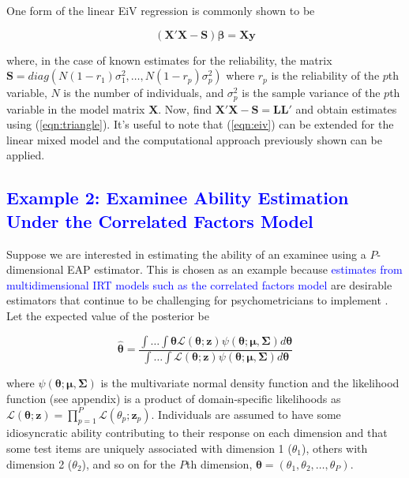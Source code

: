 \documentclass[12pt]{article}
\begin{document}
One form of the linear EiV regression is commonly shown to be \cite{stata:eiv}

\begin{equation}
\label{eqn:eiv}
(\bm{X}'\bm{X} - \bm{S})\bm{\beta} = \bm{X}\bm{y} 
\end{equation}

\noindent where, in the case of known estimates for the reliability, the matrix $\bm{S} = diag(N(1-r_1)\sigma^2_1, \ldots, N(1-r_p)\sigma^2_p) $ where $r_p$ is the reliability of the $p$th variable, $N$ is the number of individuals, and $\sigma^2_p$ is the sample variance of the $p$th variable in the model matrix $\bm{X}$.  Now, find $\bm{X}'\bm{X} - \bm{S} = \bm{L}\bm{L}'$ and obtain estimates using (\ref{eqn:triangle}). It's useful to note that (\ref{eqn:eiv}) can be extended for the linear mixed model and the computational approach previously shown can be applied. 

\subsection*{\textcolor{blue}{Example 2: Examinee Ability Estimation Under the Correlated Factors Model}}

Suppose we are interested in estimating the ability of an examinee using a $P$-dimensional EAP estimator. This is chosen as an example because \textcolor{blue}{estimates from multidimensional IRT models such as the correlated factors model \cite{cai:fisher}} are desirable estimators that continue to be challenging for psychometricians to implement \cite{Chalmers,DeMars2005,ferrando}. Let the expected value of the posterior be 

\begin{equation}
\label{eqn:scoreIntegral}
\widehat{\boldsymbol{\theta}} = \frac{\int \dots \int \boldsymbol{\theta} \mathcal{L}(\boldsymbol{\theta};\boldsymbol{z}) \psi(\boldsymbol{\theta};\boldsymbol{\mu},\boldsymbol{\Sigma})d\boldsymbol{\theta}}{\int \dots \int \mathcal{L}(\boldsymbol{\theta};\boldsymbol{z})\psi(\boldsymbol{\theta};\boldsymbol{\mu},\boldsymbol{\Sigma})d\boldsymbol{\theta}}
\end{equation}

\noindent where $\psi(\boldsymbol{\theta};\boldsymbol{\mu},\boldsymbol{\Sigma})$ is the multivariate normal density function and the likelihood function (see appendix) is a product of domain-specific likelihoods as $\mathcal{L}(\boldsymbol{\theta};\boldsymbol{z}) = \prod^P_{p=1}\mathcal{L}(\theta_p;\bm{z}_p)$. Individuals are assumed to have some idiosyncratic ability contributing to their response on each dimension and that some test items are uniquely associated with dimension 1 ($\theta_1$), others with dimension 2 ($\theta_2$), and so on for the $P$th dimension, $\boldsymbol{\theta}\boldsymbol{=}(\theta_1, \theta_2,\dots ,\theta_P)$. 
\end{document}
